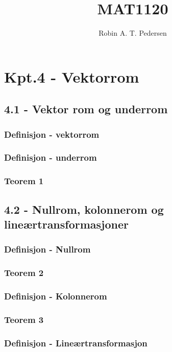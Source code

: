 \documentclass{article}
\begin{document}
  \title{MAT1120}
  \author{Robin A. T. Pedersen}
  \maketitle
  \tableofcontents

  \setcounter{section}{3} %
  \section{Kpt.4 - Vektorrom}
    \subsection{4.1 - Vektor rom og underrom}
      \subsubsection{Definisjon - vektorrom}
        
      \subsubsection{Definisjon - underrom}
        
      \subsubsection{Teorem 1}
        
    \subsection{4.2 - Nullrom, kolonnerom og lineærtransformasjoner}
      \subsubsection{Definisjon - Nullrom}
        
      \subsubsection{Teorem 2}
        
      \subsubsection{Definisjon - Kolonnerom}
        
      \subsubsection{Teorem 3}
        
      \subsubsection{Definisjon - Lineærtransformasjon}
        
\end{document}
